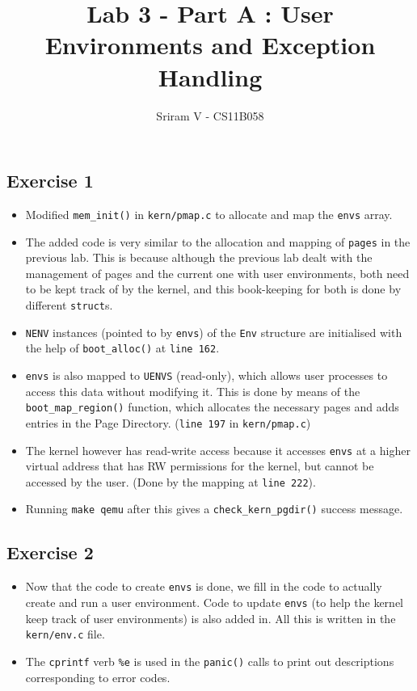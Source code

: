 \documentclass[]{article}
\title{Lab 3 - Part A : User Environments and Exception Handling}
\author{Sriram V - CS11B058}
\date{}
\begin{document}
\maketitle

\subsection{Exercise 1}

\begin{itemize}
\itemsep1pt\parskip0pt
\item
  Modified \texttt{mem\_init()} in \texttt{kern/pmap.c} to allocate and
  map the \texttt{envs} array.
\item
  The added code is very similar to the allocation and mapping of
  \texttt{pages} in the previous lab. This is because although the
  previous lab dealt with the management of pages and the current one
  with user environments, both need to be kept track of by the kernel,
  and this book-keeping for both is done by different \texttt{struct}s.
\item
  \texttt{NENV} instances (pointed to by \texttt{envs}) of the
  \texttt{Env} structure are initialised with the help of
  \texttt{boot\_alloc()} at \texttt{line 162}.
\item
  \texttt{envs} is also mapped to \texttt{UENVS} (read-only), which
  allows user processes to access this data without modifying it. This
  is done by means of the \texttt{boot\_map\_region()} function, which
  allocates the necessary pages and adds entries in the Page Directory.
  (\texttt{line 197} in \texttt{kern/pmap.c})
\item
  The kernel however has read-write access because it accesses
  \texttt{envs} at a higher virtual address that has RW permissions for
  the kernel, but cannot be accessed by the user. (Done by the mapping
  at \texttt{line 222}).
\item
  Running \texttt{make qemu} after this gives a
  \texttt{check\_kern\_pgdir()} success message.
\end{itemize}

\subsection{Exercise 2}

\begin{itemize}
\itemsep1pt\parskip0pt
\item
  Now that the code to create \texttt{envs} is done, we fill in the code
  to actually create and run a user environment. Code to update
  \texttt{envs} (to help the kernel keep track of user environments) is
  also added in. All this is written in the \texttt{kern/env.c} file.
\item
  The \texttt{cprintf} verb \texttt{\%e} is used in the \texttt{panic()}
  calls to print out descriptions corresponding to error codes.
\end{itemize}
\end{document}
